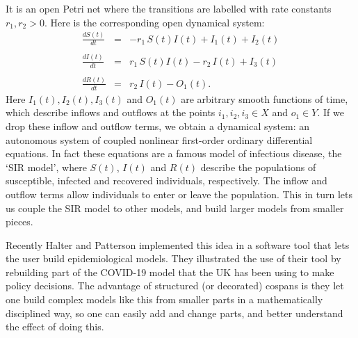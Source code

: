 \documentclass[reqno]{amsart}
\begin{document}
It is an open Petri net where the transitions are labelled with rate constants $r_1, r_2 > 0$.
Here is the corresponding open dynamical system:
\begin{equation}
\label{eq:openPetrir}
  \begin{array}{ccl} \displaystyle{\frac{dS(t)}{dt}} &=& -r_1 \, S(t)I(t)  + I_1(t) + I_2(t) \\ \\
\displaystyle{\frac{dI(t)}{dt}}  &=& r_1\, S(t)I(t) - r_2 \, I(t) + I_3(t)  \\  \\
\displaystyle{\frac{dR(t)}{dt}}  &=&   r_2 \, I(t)  - O_1(t).
\end{array}
\end{equation}
Here $I_1(t),I_2(t),I_3(t)$ and $O_1(t)$ are arbitrary smooth functions of time, which describe inflows and outflows at the points $i_1,i_2,i_3 \in X$ and $o_1 \in Y$.
If we drop these inflow and outflow terms, we obtain a dynamical system: an autonomous system of coupled nonlinear first-order ordinary differential equations.   In fact these equations are a famous model of infectious disease, the `SIR model', where $S(t)$, $I(t)$ and $R(t)$ describe the populations of susceptible, infected and recovered individuals, respectively.   The inflow and outflow terms allow individuals to enter or leave the population.   This in turn lets us couple the SIR model to other models, and build larger models from smaller pieces.  

Recently Halter and Patterson \cite{HP} implemented this idea in a software tool that lets the user build epidemiological models.  They illustrated the use of their tool by rebuilding part of the COVID-19 model that the UK has been using to make policy decisions.  The advantage of structured (or decorated) cospans is they let one build complex models like this from smaller parts in a mathematically disciplined way, so one can easily add and change parts, and better understand the effect of doing this.
\end{document}
